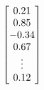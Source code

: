 \documentclass[preview]{standalone}
\begin{document}
\begin{align*}
\special{dvisvgm:raw <g id='unique000'>}\begin{bmatrix} 0.21 \\ 0.85 \\ {-0.34} \\ 0.67 \\ \vdots \\ 0.12 \end{bmatrix}\special{dvisvgm:raw </g>}
\end{align*}
\end{document}
